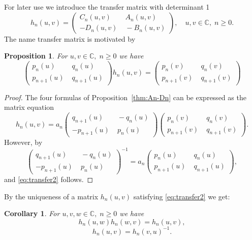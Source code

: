 \documentclass [12pt]{article}
\newtheorem{prop}[thm]{Proposition}
\newtheorem{cor}[thm]{Corollary}
\begin{document}
For later use we introduce the transfer matrix with determinant 1
\begin{equation}\label{eq:transfer1}
h_n(u,v)=\left(\begin{array}{cc} C_n(u,v)&\; A_n(u,v)\\
-D_n(u,v)&\; -B_n(u,v)\end{array}\right),\quad u,v\in\mathbb
C,\;n\ge 0.
\end{equation}
The name transfer matrix is motivated by

\begin{prop}\label{thm:transfer} For $u,v\in\mathbb C,\;n\ge 0$ we have
\begin{equation}\label{eq:transfer2}
\left(\begin{array}{cc}
p_n(u)&\;q_n(u)\\
p_{n+1}(u)&\;q_{n+1}(u)\end{array}\right)h_n(u,v)=\left(\begin{array}{cc}
p_n(v)&\;q_n(v)\\
p_{n+1}(v)&\;q_{n+1}(v)\end{array}\right)
\end{equation}
\end{prop}

\begin{proof} The four formulas of Proposition~\ref{thm:An-Dn} can be expressed
as the matrix equation
$$
h_n(u,v)=a_n
\left(\begin{array}{cc}
q_{n+1}(u)&\;-q_n(u)\\
-p_{n+1}(u)&\;p_{n}(u)\end{array}\right)\left(\begin{array}{cc}
p_n(v)&\;q_n(v)\\
p_{n+1}(v)&\;q_{n+1}(v)\end{array}\right).
$$
However, by \cite[Equation (5.52)]{Sch}
$$
\left(\begin{array}{cc}
q_{n+1}(u)&\;-q_n(u)\\
-p_{n+1}(u)&\;p_{n}(u)\end{array}\right)^{-1}=a_n
\left(\begin{array}{cc}
p_n(u)&\;q_n(u)\\
p_{n+1}(u)&\;q_{n+1}(u)\end{array}\right),
$$
and \eqref{eq:transfer2} follows.\end{proof}

By the uniqueness of a matrix $h_n(u,v)$ satisfying \eqref{eq:transfer2} we get:
\begin{cor}\label{thm:transfercor} For $u,v,w\in\mathbb C,\;n\ge 0$ we
  have
\begin{equation*}\label{eq:transfer3}
h_n(u,w)h_n(w,v)=h_n(u,v),
\end{equation*}
\begin{equation*}\label{eq:transfer4}
h_n(u,v)=h_n(v,u)^{-1}.
\end{equation*}
\end{cor}
\end{document}
